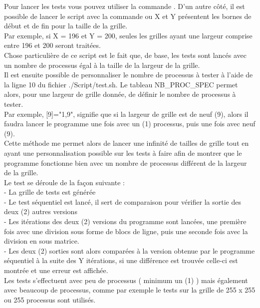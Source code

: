 \documentclass[10pt,a4paper]{article}
\begin{document}
Pour lancer les tests vous pouvez utiliser la commande . D'un autre côté, il est possible de lancer le script avec la commande   ou X et Y présentent les bornes de début et de fin pour la taille de la grille. \\
Par exemple, si X = 196 et Y = 200, seules les grilles ayant une largeur comprise entre 196 et 200 seront traitées. \\

Chose particulière de ce script est le fait que, de base, les tests sont lancés avec un nombre de processus égal à la taille de la largeur de la grille.\\
Il est ensuite possible de personnaliser le nombre de processus à tester à l'aide de la ligne 10 du fichier ./Script/test.sh. Le tableau NB\_PROC\_SPEC permet alors, pour une largeur de grille donnée, de définir le nombre de processus à tester.\\
Par exemple, [9]="1,9", signifie que si la largeur de grille est de neuf (9), alors il faudra lancer le programme une fois avec un (1) processus, puis une fois avec neuf (9). \\
Cette méthode me permet alors de lancer une infinité de tailles de grille tout en ayant une personnalisation possible sur les tests à faire afin de montrer que le programme fonctionne bien avec un nombre de processus différent de la largeur de la grille. \\

Le test se déroule de la façon suivante : \\
\indent - La grille de tests est générée \\
\indent - Le test séquentiel est lancé, il sert de comparaison pour vérifier la sortie des deux (2) autres versions \\
\indent - Les itérations des deux (2) versions du programme sont lancées, une première fois avec une division sous forme de blocs de ligne, puis une seconde fois avec la division en sous matrice. \\
\indent - Les deux (2) sorties sont alors comparées à la version obtenue par le programme séquentiel à la suite des Y itérations, si une différence est trouvée celle-ci est montrée et une erreur est affichée.\\

Les tests s'effectuent avec peu de processus ( minimum un (1) ) mais également avec beaucoup de processus, comme par exemple le tests sur la grille de 255 x 255 ou 255 processus sont utilisés.\\
\end{document}

